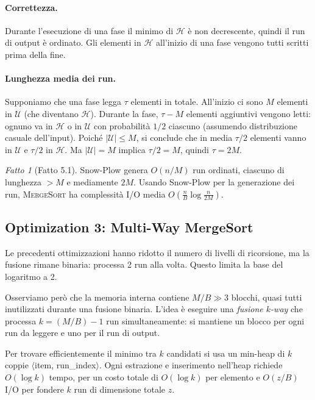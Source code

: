 \documentclass[12pt, a4paper, oneside]{book}
\theoremstyle{plain}
\theoremstyle{definition}
\theoremstyle{remark}
\newtheorem{fattore}[teorema]{Fatto}
\begin{document}
\paragraph{Correttezza.} Durante l'esecuzione di una fase il minimo di $\mathcal{H}$ è non decrescente, quindi il run di output è ordinato. Gli elementi in $\mathcal{H}$ all'inizio di una fase vengono tutti scritti prima della fine.

\paragraph{Lunghezza media dei run.} Supponiamo che una fase legga $\tau$ elementi in totale. All'inizio ci sono $M$ elementi in $\mathcal{U}$ (che diventano $\mathcal{H}$). Durante la fase, $\tau - M$ elementi aggiuntivi vengono letti: ognuno va in $\mathcal{H}$ o in $\mathcal{U}$ con probabilità $1/2$ ciascuno (assumendo distribuzione casuale dell'input). Poiché $|\mathcal{U}| \le M$, si conclude che in media $\tau/2$ elementi vanno in $\mathcal{U}$ e $\tau/2$ in $\mathcal{H}$. Ma $|\mathcal{U}| = M$ implica $\tau/2 = M$, quindi $\tau = 2M$.

\begin{fattore}[Fatto 5.1]
Snow-Plow genera $O(n/M)$ run ordinati, ciascuno di lunghezza $> M$ e mediamente $2M$. Usando Snow-Plow per la generazione dei run, \textsc{MergeSort} ha complessità I/O media $O\!\left(\frac{n}{B}\log\frac{n}{2M}\right)$.
\end{fattore}

\subsection{Optimization 3: Multi-Way MergeSort}
\label{sec:multiway-mergesort}

Le precedenti ottimizzazioni hanno ridotto il numero di livelli di ricorsione, ma la fusione rimane binaria: processa 2 run alla volta. Questo limita la base del logaritmo a 2.

Osserviamo però che la memoria interna contiene $M/B \gg 3$ blocchi, quasi tutti inutilizzati durante una fusione binaria. L'idea è eseguire una \emph{fusione $k$-way} che processa $k = (M/B) - 1$ run simultaneamente: si mantiene un blocco per ogni run da leggere e uno per il run di output.

Per trovare efficientemente il minimo tra $k$ candidati si usa un min-heap di $k$ coppie $\langle$item, run\_index$\rangle$. Ogni estrazione e inserimento nell'heap richiede $O(\log k)$ tempo, per un costo totale di $O(\log k)$ per elemento e $O(z/B)$ I/O per fondere $k$ run di dimensione totale $z$.
\end{document}
